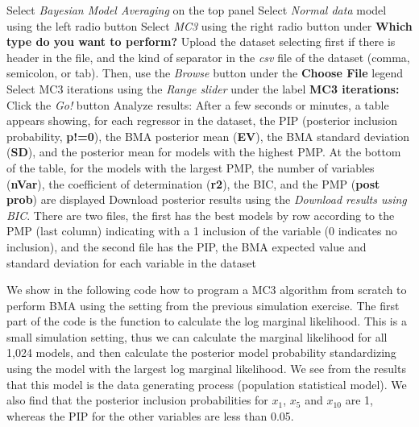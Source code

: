 \begin{algorithm}[h!]
	\caption{Bayesian model averaging in linear Gaussian models using Markov chain Monte Carlo model composition}\label{alg:BMAnormalMC3}
	\begin{algorithmic}[1]  		 			
		\State Select \textit{Bayesian Model Averaging} on the top panel
		\State Select \textit{Normal data} model using the left radio button
		\State Select \textit{MC3} using the right radio button under \textbf{Which type do you want to perform?}
		\State Upload the dataset selecting first if there is header in the file, and the kind of separator in the \textit{csv} file of the dataset (comma, semicolon, or tab). Then, use the \textit{Browse} button under the \textbf{Choose File} legend
		\State Select MC3 iterations using the \textit{Range slider} under the label \textbf{MC3 iterations:}
		\State Click the \textit{Go!} button
		\State Analyze results: After a few seconds or minutes, a table appears showing, for each regressor in the dataset, the PIP (posterior inclusion probability, \textbf{p!=0}), the BMA posterior mean (\textbf{EV}), the BMA standard deviation (\textbf{SD}), and the posterior mean for models with the highest PMP. At the bottom of the table, for the models with the largest PMP, the number of variables (\textbf{nVar}), the coefficient of determination (\textbf{r2}), the BIC, and the PMP (\textbf{post prob}) are displayed
		\State Download posterior results using the \textit{Download results using BIC}. There are two files, the first has the best models by row according to the PMP (last column) indicating with a 1 inclusion of the variable (0 indicates no inclusion), and the second file has the PIP, the BMA expected value and standard deviation for each variable in the dataset
	\end{algorithmic} 
\end{algorithm}

We show in the following code how to program a MC3 algorithm from scratch to perform BMA using the setting from the previous simulation exercise. The first part of the code is the function to calculate the log marginal likelihood. This is a small simulation setting, thus we can calculate the marginal likelihood for all 1,024 models, and then calculate the posterior model probability standardizing using the model with the largest log marginal likelihood. We see from the results that this model is the data generating process (population statistical model). We also find that the posterior inclusion probabilities for $x_{1}$, $x_{5}$ and $x_{10}$ are 1, whereas the PIP for the other variables are less than 0.05. 

